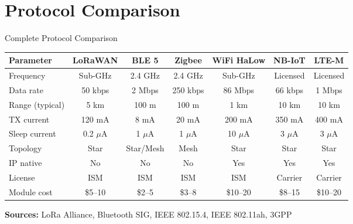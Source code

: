 \documentclass[aspectratio=169,11pt]{beamer}
\begin{document}
\section{Protocol Comparison}

\begin{frame}{Complete Protocol Comparison}
    \begin{table}
        \centering
        \tiny
        \begin{tabular}{@{}lcccccc@{}}
            \toprule
            \textbf{Parameter} & \textbf{LoRaWAN} & \textbf{BLE 5} & \textbf{Zigbee} & \textbf{WiFi HaLow} & \textbf{NB-IoT} & \textbf{LTE-M} \\
            \midrule
            Frequency & Sub-GHz & 2.4 GHz & 2.4 GHz & Sub-GHz & Licensed & Licensed \\
            Data rate & 50 kbps & 2 Mbps & 250 kbps & 86 Mbps & 66 kbps & 1 Mbps \\
            Range (typical) & 5 km & 100 m & 100 m & 1 km & 10 km & 10 km \\
            TX current & 120 mA & 8 mA & 20 mA & 200 mA & 350 mA & 400 mA \\
            Sleep current & 0.2 $\mu$A & 1 $\mu$A & 1 $\mu$A & 10 $\mu$A & 3 $\mu$A & 3 $\mu$A \\
            Topology & Star & Star/Mesh & Mesh & Star & Star & Star \\
            IP native & No & No & No & Yes & Yes & Yes \\
            License & ISM & ISM & ISM & ISM & Carrier & Carrier \\
            Module cost & \$5--10 & \$2--5 & \$3--8 & \$10--20 & \$8--15 & \$10--20 \\
            \bottomrule
        \end{tabular}
    \end{table}
    
    \vspace{0.2cm}
    \textbf{Sources:} LoRa Alliance, Bluetooth SIG, IEEE 802.15.4, IEEE 802.11ah, 3GPP
\end{frame}
\end{document}

